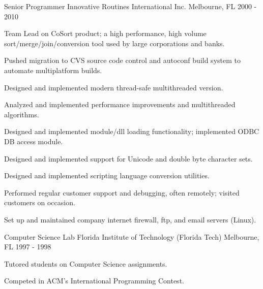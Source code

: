 \begin{cventries}
  \cventry
    {Senior Programmer} %
    {Innovative Routines International Inc.} %
    {Melbourne, FL} %
    {2000 - 2010} %
    {
      \begin{cvitems} %
        \item {Team Lead on CoSort product; a high performance, high volume sort/merge/join/conversion tool used by large corporations and banks.}
        \item {Pushed migration to CVS source code control and autoconf build system to automate multiplatform builds.}
        \item {Designed and implemented modern thread-safe multithreaded version.}
        \item {Analyzed and implemented performance improvements and multithreaded algorithms.}
        \item {Designed and implemented module/dll loading functionality; implemented ODBC DB access module.}
        \item {Designed and implemented support for Unicode and double byte character sets.}
        \item {Designed and implemented scripting language conversion utilities.}
        \item {Performed regular customer support and debugging, often remotely; visited customers on occasion.}
        \item {Set up and maintained company internet firewall, ftp, and email servers (Linux).}
      \end{cvitems}
    }

  \cventry
  {Computer Science Lab} %
  {Florida Institute of Technology (Florida Tech)} %
  {Melbourne, FL} %
  {1997 - 1998} %
  {
    \begin{cvitems} %
      \item {Tutored students on Computer Science assignments.}
      \item {Competed in ACM's International Programming Contest.}
    \end{cvitems}
  }


\end{cventries}
